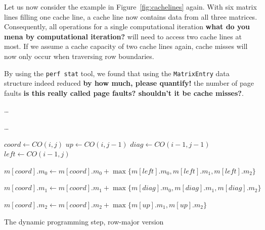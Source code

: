\documentclass[runningheads,a4paper]{llncs}
\begin{document}
Let us now consider the example in Figure~\ref{fig:cachelines} again. 
With six matrix lines filling one cache line, a cache line now contains data from all three matrices. 
Consequently, all operations for a single computational iteration {\bf what do you mena by computational iteration?} 
will need to access two cache lines at most. 
If we assume a cache capacity of two cache lines again, cache misses will now only occur when traversing row boundaries.

By using the \texttt{perf stat} tool, we found that using the \texttt{MatrixEntry} data structure indeed reduced {\bf by how much, please quantify!} 
the number of page faults {\bf is this really called page faults? shouldn't it be cache misses?}.

\begin{algorithm}

\ldots{}
 {
	 {
		\ldots{}
		
		$coord \gets CO(i, j)$\;	
		$up \gets CO(i, j-1)$\;
		$diag \gets CO(i-1, j-1)$\;		
		$left \gets CO(i-1, j)$\;
		
		$m[coord].m_0 \gets m[coord].m_0 + \max\{m[left].m_0, m[left].m_1, m[left].m_2\}$\;
		
		$m[coord].m_1 \gets m[coord].m_1 + \max\{m[diag].m_0, m[diag].m_1, m[diag].m_2\}$\;
		
		$m[coord].m_2 \gets m[coord].m_2 + \max\{m[up].m_1, m[up].m_2\}$\;
	}
}

\caption{The dynamic programming step, row-major version}
\label{alg:dp}
\end{algorithm}
\end{document}
